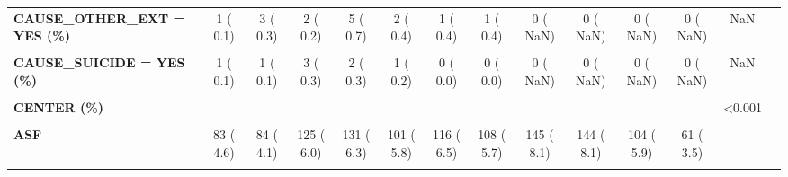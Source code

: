 \documentclass[
]{article}
\begin{document}
\begin{table}[H]
\begin{tabular}[t]{>{\raggedright\arraybackslash}p{5em}ccccccccccccc}
\textbf{CAUSE\_OTHER\_EXT = YES (\%)} & 1 (  0.1) & 3 (  0.3) & 2 (  0.2) & 5 (  0.7) & 2 (  0.4) & 1 (  0.4) & 1 (  0.4) & 0 (  NaN) & 0 (  NaN) & 0 (  NaN) & 0 (  NaN) & NaN & \\
\textbf{\cellcolor{gray!10}{CAUSE\_PERINATAL = NO (\%)}} & \cellcolor{gray!10}{916 (100.0)} & \cellcolor{gray!10}{969 (100.0)} & \cellcolor{gray!10}{899 (100.0)} & \cellcolor{gray!10}{736 (100.0)} & \cellcolor{gray!10}{458 (100.0)} & \cellcolor{gray!10}{273 (100.0)} & \cellcolor{gray!10}{225 (100.0)} & \cellcolor{gray!10}{0 (  NaN)} & \cellcolor{gray!10}{0 (  NaN)} & \cellcolor{gray!10}{0 (  NaN)} & \cellcolor{gray!10}{0 (  NaN)} & \cellcolor{gray!10}{NA} & \cellcolor{gray!10}{}\\
\textbf{CAUSE\_SUICIDE = YES (\%)} & 1 (  0.1) & 1 (  0.1) & 3 (  0.3) & 2 (  0.3) & 1 (  0.2) & 0 (  0.0) & 0 (  0.0) & 0 (  NaN) & 0 (  NaN) & 0 (  NaN) & 0 (  NaN) & NaN & \\
\textbf{\cellcolor{gray!10}{CCUDAYS (mean (SD))}} & \cellcolor{gray!10}{5.72 (4.66)} & \cellcolor{gray!10}{4.89 (5.09)} & \cellcolor{gray!10}{4.84 (4.10)} & \cellcolor{gray!10}{4.65 (3.59)} & \cellcolor{gray!10}{4.38 (3.57)} & \cellcolor{gray!10}{4.08 (2.62)} & \cellcolor{gray!10}{4.03 (2.98)} & \cellcolor{gray!10}{4.01 (4.07)} & \cellcolor{gray!10}{3.95 (3.84)} & \cellcolor{gray!10}{3.87 (4.27)} & \cellcolor{gray!10}{3.72 (3.53)} & \cellcolor{gray!10}{<0.001} & \cellcolor{gray!10}{}\\
\textbf{CENTER (\%)} &  &  &  &  &  &  &  &  &  &  &  & <0.001 & \\
\textbf{\cellcolor{gray!10}{AFL}} & \cellcolor{gray!10}{52 (  2.9)} & \cellcolor{gray!10}{74 (  3.6)} & \cellcolor{gray!10}{86 (  4.1)} & \cellcolor{gray!10}{78 (  3.8)} & \cellcolor{gray!10}{67 (  3.8)} & \cellcolor{gray!10}{65 (  3.7)} & \cellcolor{gray!10}{68 (  3.6)} & \cellcolor{gray!10}{92 (  5.1)} & \cellcolor{gray!10}{51 (  2.9)} & \cellcolor{gray!10}{58 (  3.3)} & \cellcolor{gray!10}{61 (  3.5)} & \cellcolor{gray!10}{} & \cellcolor{gray!10}{}\\
\textbf{ASF} & 83 (  4.6) & 84 (  4.1) & 125 (  6.0) & 131 (  6.3) & 101 (  5.8) & 116 (  6.5) & 108 (  5.7) & 145 (  8.1) & 144 (  8.1) & 104 (  5.9) & 61 (  3.5) &  & \\
\textbf{\cellcolor{gray!10}{AST}} & \cellcolor{gray!10}{0 (  0.0)} & \cellcolor{gray!10}{0 (  0.0)} & \cellcolor{gray!10}{0 (  0.0)} & \cellcolor{gray!10}{0 (  0.0)} & \cellcolor{gray!10}{0 (  0.0)} & \cellcolor{gray!10}{0 (  0.0)} & \cellcolor{gray!10}{0 (  0.0)} & \cellcolor{gray!10}{0 (  0.0)} & \cellcolor{gray!10}{51 (  2.9)} & \cellcolor{gray!10}{49 (  2.8)} & \cellcolor{gray!10}{48 (  2.7)} & \cellcolor{gray!10}{} & \cellcolor{gray!10}{}\\

\end{tabular}
\end{table}
\end{document}
